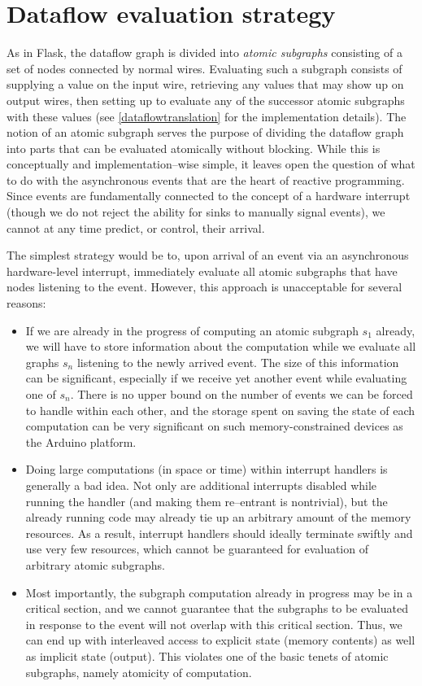 \documentclass[a4paper, oneside, final]{memoir}
\begin{document}
\section{Dataflow evaluation strategy}

As in Flask, the dataflow graph is divided into \textit{atomic
  subgraphs} consisting of a set of nodes connected by normal wires.
Evaluating such a subgraph consists of supplying a value on the input
wire, retrieving any values that may show up on output wires, then
setting up to evaluate any of the successor atomic subgraphs with
these values (see \ref{dataflowtranslation} for the implementation
details).  The notion of an atomic subgraph serves the purpose of
dividing the dataflow graph into parts that can be evaluated
atomically without blocking.  While this is conceptually and
implementation--wise simple, it leaves open the question of what to do
with the asynchronous events that are the heart of reactive
programming.  Since events are fundamentally connected to the concept
of a hardware interrupt (though we do not reject the ability for sinks
to manually signal events), we cannot at any time predict, or control,
their arrival.

The simplest strategy would be to, upon arrival of an event via an
asynchronous hardware-level interrupt, immediately evaluate all atomic
subgraphs that have nodes listening to the event.  However, this
approach is unacceptable for several reasons:

\begin{itemize}
\item If we are already in the progress of computing an atomic
  subgraph $s_1$ already, we will have to store information about the
  computation while we evaluate all graphs $s_n$ listening to the
  newly arrived event.  The size of this information can be
  significant, especially if we receive yet another event while
  evaluating one of $s_n$.  There is no upper bound on the number of
  events we can be forced to handle within each other, and the storage
  spent on saving the state of each computation can be very
  significant on such memory-constrained devices as the Arduino
  platform.
\item Doing large computations (in space or time) within interrupt
  handlers is generally a bad idea.  Not only are additional
  interrupts disabled while running the handler (and making them
  re--entrant is nontrivial), but the already running code may already
  tie up an arbitrary amount of the memory resources.  As a result,
  interrupt handlers should ideally terminate swiftly and use very few
  resources, which cannot be guaranteed for evaluation of arbitrary
  atomic subgraphs.
\item Most importantly, the subgraph computation already in progress
  may be in a critical section, and we cannot guarantee that the
  subgraphs to be evaluated in response to the event will not overlap
  with this critical section.  Thus, we can end up with interleaved
  access to explicit state (memory contents) as well as implicit state
  (output).  This violates one of the basic tenets of atomic
  subgraphs, namely atomicity of computation.
\end{itemize}
\end{document}
